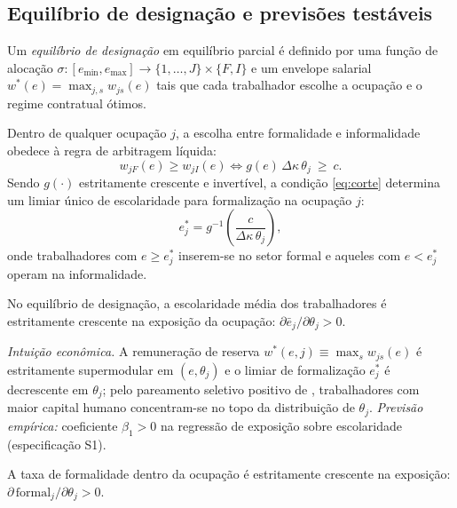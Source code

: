\subsection{Equilíbrio de designação e previsões testáveis}

Um \emph{equilíbrio de designação} em equilíbrio parcial é definido por uma função de alocação $\sigma: [e_{\min}, e_{\max}] \to \{1, \dots, J\} \times \{F, I\}$ e um envelope salarial $w^*(e) = \max_{j, s} w_{js}(e)$ tais que cada trabalhador escolhe a ocupação e o regime contratual ótimos.

Dentro de qualquer ocupação $j$, a escolha entre formalidade e informalidade obedece à regra de arbitragem líquida:
\begin{equation}
    w_{jF}(e) \ge w_{jI}(e) \iff g(e) \, \Delta\kappa \, \theta_j \ \ge \ c.
    \label{eq:corte}
\end{equation}
Sendo $g(\cdot)$ estritamente crescente e invertível, a condição \eqref{eq:corte} determina um limiar único de escolaridade para formalização na ocupação $j$:
\begin{equation}
    e^*_j = g^{-1}\!\left(\frac{c}{\Delta\kappa \, \theta_j}\right),
    \label{eq:limiar}
\end{equation}
onde trabalhadores com $e \ge e^*_j$ inserem-se no setor formal e aqueles com $e < e^*_j$ operam na informalidade.

\begin{proposicao}
\label{prop:gradiente}
No equilíbrio de designação, a escolaridade média dos trabalhadores é estritamente crescente na exposição da ocupação: $\partial \bar{e}_j / \partial \theta_j > 0$.
\end{proposicao}

\textit{Intuição econômica.} A remuneração de reserva $w^*(e, j) \equiv \max_{s} w_{js}(e)$ é estritamente supermodular em $(e, \theta_j)$ e o limiar de formalização $e_j^*$ é decrescente em $\theta_j$; pelo pareamento seletivo positivo de \citet{becker1973theory}, trabalhadores com maior capital humano concentram-se no topo da distribuição de $\theta_j$. \emph{Previsão empírica:} coeficiente $\beta_1 > 0$ na regressão de exposição sobre escolaridade (especificação S1).

\begin{proposicao}
\label{prop:formalidade}
A taxa de formalidade dentro da ocupação é estritamente crescente na exposição: $\partial \, \text{formal}_j / \partial \theta_j > 0$.
\end{proposicao}


